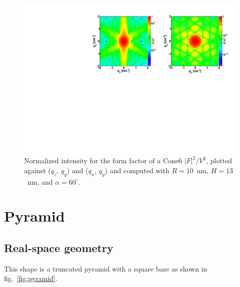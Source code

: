 \begin{figure}[h]
\begin{center}
\includegraphics[width=\textwidth]{Figures/figffcone6}
\end{center}
\caption{Normalized intensity for the form factor of a Cone6 $|F|^2/V^2$, plotted against ($q_z$, $q_y$) and ($q_x$, $q_y$) and  computed with $R=10$~nm, $H=13$~nm, and $\alpha=60^{\circ}$.}
\label{fig:FFCone6Ex}
\end{figure}


\FloatBarrier


\newpage{\cleardoublepage}
\section{Pyramid}

\subsection{Real-space geometry}
This shape is a  truncated pyramid with a square base as shown in fig.~\ref{fig:pyramid}.

